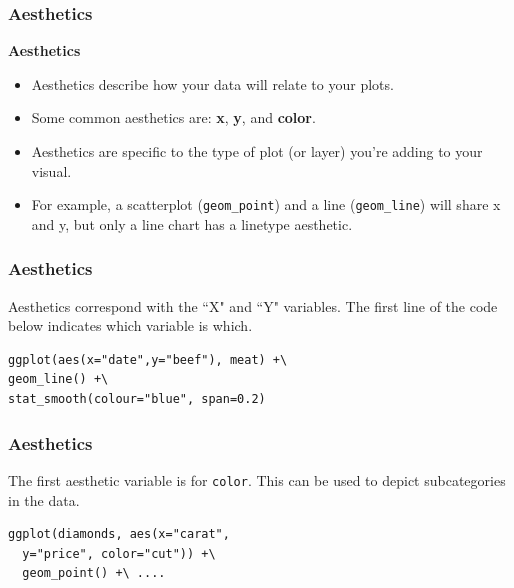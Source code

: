 \documentclass{beamer}
\begin{document}
\begin{frame}[fragile]
	\frametitle{Aesthetics}
	\Large
	\noindent \textbf{Aesthetics}
	\begin{itemize}
		\item Aesthetics describe how your data will relate to your plots.
		\item Some common aesthetics are: \textbf{x}, \textbf{y}, and \textbf{color}. \item Aesthetics are specific to the type of plot (or layer) you're adding to your visual. 
		\item For example, a scatterplot (\texttt{geom\_point}) and a line (\texttt{geom\_line}) will share x and y, but only a line chart has a linetype aesthetic.
	\end{itemize}
	
	
\end{frame}
\begin{frame}[fragile]
	\frametitle{Aesthetics}
	\Large
Aesthetics correspond with the ``X" and ``Y" variables. The first line of the code below indicates which variable is which.
\begin{framed}
\begin{verbatim}
ggplot(aes(x="date",y="beef"), meat) +\
geom_line() +\
stat_smooth(colour="blue", span=0.2)
\end{verbatim}
\end{framed}

\end{frame}
\begin{frame}[fragile]
	\frametitle{Aesthetics}
	\Large
The first aesthetic variable is for \texttt{color}. This can be used to depict subcategories in the data.
	\begin{framed}
		\begin{verbatim}
ggplot(diamonds, aes(x="carat", 
  y="price", color="cut")) +\
  geom_point() +\ ....
	\end{verbatim}
\end{framed}

\end{frame}
\end{document}
